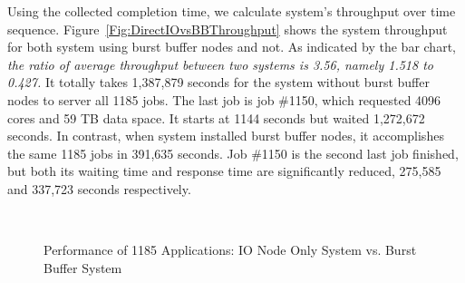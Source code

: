 Using the collected completion time, we calculate system's throughput over time sequence.
Figure~\ref{Fig:DirectIOvsBBThroughput} shows the system throughput for
both system using burst buffer nodes and not.
As indicated by the bar chart,
\textit{the ratio of average throughput between two systems is 3.56,
namely 1.518 to 0.427.}
It totally takes 1,387,879 seconds for the system without burst buffer nodes to
server all 1185 jobs.
The last job is job \#1150, which requested 4096 cores and 59 TB data space.
It starts at 1144 seconds but waited 1,272,672 seconds.
In contrast, when system installed burst buffer nodes,
it accomplishes the same 1185 jobs in 391,635 seconds.
Job \#1150 is the second last job finished, but both its waiting time and response time
are significantly reduced, 275,585 and 337,723 seconds respectively.

\begin{figure}[!t]
        \centering
        ~
        \caption{Performance of 1185 Applications: IO Node Only System vs. Burst Buffer System}
        \label{Fig:DirectIOPerformance}
\end{figure}

